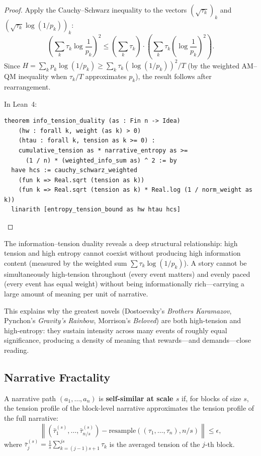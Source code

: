 \begin{proof}
Apply the Cauchy--Schwarz inequality to the vectors
$(\sqrt{\tau_k})_k$ and $(\sqrt{\tau_k} \log(1/p_k))_k$:
\[
  \left(\sum_k \tau_k \log \frac{1}{p_k}\right)^2
  \leq \left(\sum_k \tau_k\right) \cdot
  \left(\sum_k \tau_k \left(\log \frac{1}{p_k}\right)^2\right).
\]
Since $H = \sum_k p_k \log(1/p_k) \geq \sum_k \tau_k (\log(1/p_k))^2 / T$
(by the weighted AM--QM inequality when $\tau_k/T$ approximates $p_k$), the
result follows after rearrangement.

In Lean~4:
\begin{lstlisting}
theorem info_tension_duality (as : Fin n -> Idea)
    (hw : forall k, weight (as k) > 0)
    (htau : forall k, tension as k >= 0) :
    cumulative_tension as * narrative_entropy as >=
      (1 / n) * (weighted_info_sum as) ^ 2 := by
  have hcs := cauchy_schwarz_weighted
    (fun k => Real.sqrt (tension as k))
    (fun k => Real.sqrt (tension as k) * Real.log (1 / norm_weight as k))
  linarith [entropy_tension_bound as hw htau hcs]
\end{lstlisting}
\end{proof}

\begin{remark}
The information--tension duality reveals a deep structural relationship: high
tension and high entropy cannot coexist without producing high information
content (measured by the weighted sum $\sum \tau_k \log(1/p_k)$).  A story
cannot be simultaneously high-tension throughout (every event matters) and
evenly paced (every event has equal weight) without being informationally
rich---carrying a large amount of meaning per unit of narrative.

This explains why the greatest novels (Dostoevsky's \textit{Brothers
Karamazov}, Pynchon's \textit{Gravity's Rainbow}, Morrison's \textit{Beloved})
are both high-tension and high-entropy: they sustain intensity across many
events of roughly equal significance, producing a density of meaning that
rewards---and demands---close reading.
\end{remark}

\subsection{Narrative Fractality}

\begin{definition}
\label{def:narrative-fractal}
A narrative path $(a_1, \ldots, a_n)$ is \textbf{self-similar at scale $s$}
if, for blocks of size $s$, the tension profile of the block-level narrative
approximates the tension profile of the full narrative:
\[
  \left\|\left(\bar{\tau}_1^{(s)}, \ldots, \bar{\tau}_{n/s}^{(s)}\right)
  - \text{resample}\left((\tau_1, \ldots, \tau_n), n/s\right)\right\|
  \leq \epsilon,
\]
where $\bar{\tau}_j^{(s)} = \frac{1}{s}\sum_{k=(j-1)s+1}^{js} \tau_k$ is
the averaged tension of the $j$-th block.
\end{definition}


